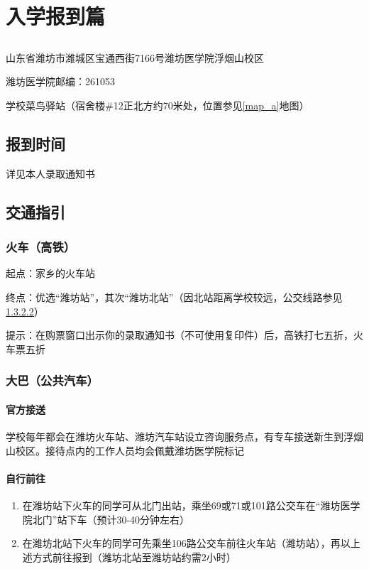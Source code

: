\chapter[入学报到篇]{入学报到篇}
\section[报到地址（也是快递地址）]{}
山东省潍坊市潍城区宝通西街7166号潍坊医学院浮烟山校区

潍坊医学院邮编：261053

学校菜鸟驿站（宿舍楼\#12正北方约70米处，位置参见\uline{\ref{map_a}}地图）

\section[报到时间]{报到时间}
详见本人录取通知书

\section[交通指引]{交通指引}
\subsection[火车（高铁）]{火车（高铁）}
起点：家乡的火车站

终点：优选“潍坊站”，其次“潍坊北站”（因北站距离学校较远，公交线路参见\uline{\ref{bus}}）

提示：在购票窗口出示你的录取通知书（不可使用复印件）后，高铁打七五折，火车票五折

\subsection[大巴（公共汽车）]{大巴（公共汽车）}

\subsubsection[官方接送]{官方接送}
学校每年都会在潍坊火车站、潍坊汽车站设立咨询服务点，有专车接送新生到浮烟山校区。接待点内的工作人员均会佩戴潍坊医学院标记

\subsubsection[自行前往]{自行前往}
\label{bus}
\begin{enumerate}
      \item 在潍坊站下火车的同学可从北门出站，乘坐69或71或101路公交车在“潍坊医学院北门”站下车（预计30-40分钟左右）
      \item 在潍坊北站下火车的同学可先乘坐106路公交车前往火车站（潍坊站），再以上述方式前往报到（潍坊北站至潍坊站约需2小时）
\end{enumerate}

